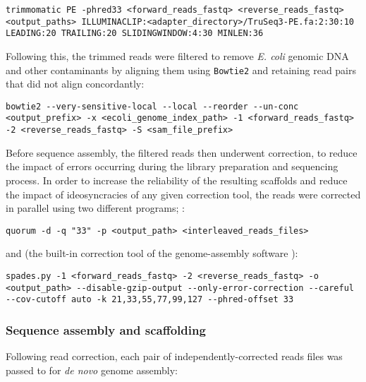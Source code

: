 \begin{lstlisting}
trimmomatic PE -phred33 <forward_reads_fastq> <reverse_reads_fastq> <output_paths> ILLUMINACLIP:<adapter_directory>/TruSeq3-PE.fa:2:30:10 LEADING:20 TRAILING:20 SLIDINGWINDOW:4:30 MINLEN:36
\end{lstlisting}

\noindent Following this, the trimmed reads were filtered to remove \textit{E. coli} genomic DNA and other contaminants by aligning them using \lstinline{Bowtie2} \parencite{langmead2012bowtie2} and retaining read pairs that did not align concordantly:

\begin{lstlisting}
bowtie2 --very-sensitive-local --local --reorder --un-conc <output_prefix> -x <ecoli_genome_index_path> -1 <forward_reads_fastq> -2 <reverse_reads_fastq> -S <sam_file_prefix>
\end{lstlisting}

\noindent Before sequence assembly, the filtered reads then underwent correction, to reduce the impact of errors occurring during the library preparation and sequencing process. In order to increase the reliability of the resulting scaffolds and reduce the impact of ideosyncracies of any given correction tool, the reads were corrected in parallel using two different programs;  \parencite{marcais2015quorum}:

\begin{lstlisting}
quorum -d -q "33" -p <output_path> <interleaved_reads_files>
\end{lstlisting}

\noindent and  (the built-in correction tool of the  genome-assembly software \parencite{bankevich2012spades,nikolenko2013bayeshammer}):

\begin{lstlisting}
spades.py -1 <forward_reads_fastq> -2 <reverse_reads_fastq> -o <output_path> --disable-gzip-output --only-error-correction --careful --cov-cutoff auto -k 21,33,55,77,99,127 --phred-offset 33
\end{lstlisting}

\subsubsection{Sequence assembly and scaffolding}
\label{sec:methods_comp_bacs_assembly}

Following read correction, each pair of independently-corrected reads files was passed to  \parencite{bankevich2012spades} for \textit{de novo} genome assembly:

